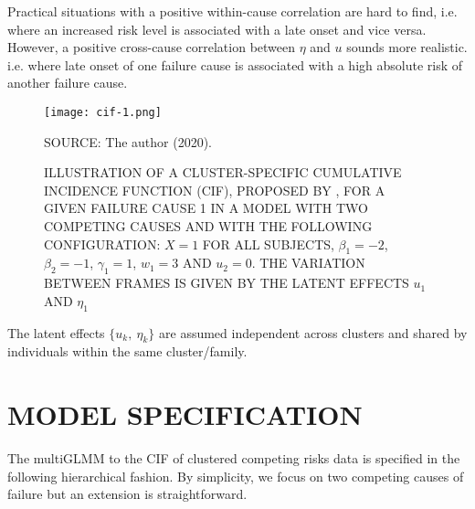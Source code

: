 Practical situations with a positive within-cause correlation are hard
to find, i.e. where an increased risk level is associated with a late
onset and vice versa. However, a positive cross-cause correlation
between \(\eta\) and \(u\) sounds more realistic. i.e. where late onset
of one failure cause is associated with a high absolute risk of another
failure cause.

\begin{figure}[H]
  \setlength{\abovecaptionskip}{.0001pt}
  \caption{ILLUSTRATION OF A CLUSTER-SPECIFIC CUMULATIVE INCIDENCE
    FUNCTION (CIF), PROPOSED BY , FOR A GIVEN
    FAILURE CAUSE 1 IN A MODEL WITH TWO COMPETING CAUSES AND WITH THE
    FOLLOWING CONFIGURATION: \(X = 1\) FOR ALL SUBJECTS, \(\beta_{1} =
    -2\), \(\beta_{2} = -1\), \(\gamma_{1} = 1\), \(w_{1} = 3\) AND
    \(u_{2} = 0\). THE VARIATION BETWEEN FRAMES IS GIVEN BY THE LATENT
    EFFECTS \(u_{1}\) AND \(\eta_{1}\)}
  \vspace{0.3cm} \centering
  \texttt{[image: cif-1.png]}
  \\
  \begin{footnotesize}
    SOURCE: The author (2020).
  \end{footnotesize}
  \label{fig:cif}
\end{figure}

The latent effects \(\{u_{k},~\eta_{k}\}\) are assumed independent
across clusters and shared by individuals within the same
cluster/family.

\section{MODEL SPECIFICATION}
\label{cap:modelitself}

The multiGLMM to the CIF of clustered competing risks data is specified
in the following hierarchical fashion. By simplicity, we focus on two
competing causes of failure but an extension is straightforward.

